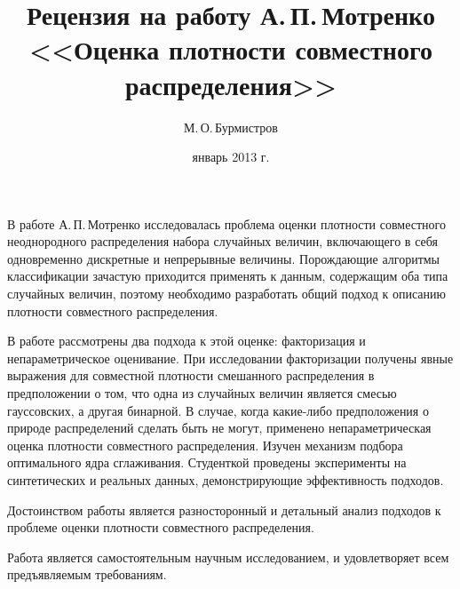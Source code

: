 \documentclass[12pt,a4paper,oneside]{article}
\begin{document}
	\title{Рецензия на работу А.\,П.\,Мотренко \\ <<Оценка плотности совместного распределения>>}
	\author{М.\,О.\,Бурмистров}
	\date{январь 2013 г.}
	\maketitle

В работе А.\,П.\,Мотренко исследовалась проблема оценки плотности совместного неоднородного распределения набора случайных величин, включающего в себя одновременно дискретные и непрерывные величины. 
Порождающие алгоритмы классификации зачастую приходится применять к данным, содержащим оба типа случайных величин, поэтому необходимо разработать общий подход к описанию плотности совместного распределения.

В работе рассмотрены два подхода к этой оценке: факторизация и непараметрическое оценивание. 
При исследовании факторизации получены явные выражения для совместной плотности смешанного распределения в предположении о том, что одна из случайных величин является смесью гауссовских, а другая бинарной. 
В случае, когда какие-либо предположения о природе распределений сделать быть не могут, применено непараметрическая оценка плотности совместного распределения. 
Изучен механизм подбора оптимального ядра сглаживания. 
Студенткой проведены эксперименты на синтетических и реальных данных, демонстрирующие эффективность подходов.

Достоинством работы является разносторонный и детальный анализ подходов к проблеме оценки плотности совместного распределения.

Работа является самостоятельным научным исследованием, и удовлетворяет всем предъявляемым требованиям.
\end{document}
